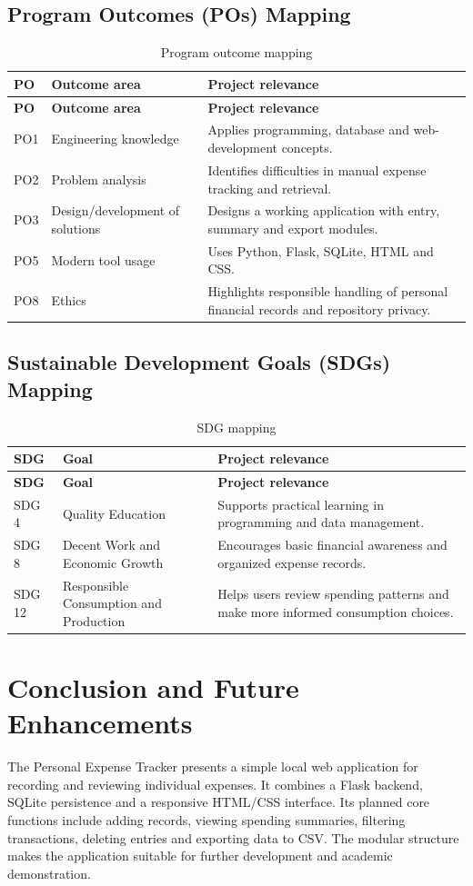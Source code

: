 \documentclass[11pt,a4paper]{report}
\begin{document}
\subsection{Program Outcomes (POs) Mapping}
\begin{longtable}{|p{1.5cm}|p{4.4cm}|p{6.7cm}|}
\caption{Program outcome mapping}\\\hline
\textbf{PO} & \textbf{Outcome area} & \textbf{Project relevance}\\\hline
\endfirsthead
\hline \textbf{PO} & \textbf{Outcome area} & \textbf{Project relevance}\\\hline
\endhead
PO1 & Engineering knowledge & Applies programming, database and web-development concepts.\\\hline
PO2 & Problem analysis & Identifies difficulties in manual expense tracking and retrieval.\\\hline
PO3 & Design/development of solutions & Designs a working application with entry, summary and export modules.\\\hline
PO5 & Modern tool usage & Uses Python, Flask, SQLite, HTML and CSS.\\\hline
PO8 & Ethics & Highlights responsible handling of personal financial records and repository privacy.\\\hline
\end{longtable}
\subsection{Sustainable Development Goals (SDGs) Mapping}
\begin{longtable}{|p{1.7cm}|p{4.7cm}|p{6.2cm}|}
\caption{SDG mapping}\\\hline
\textbf{SDG} & \textbf{Goal} & \textbf{Project relevance}\\\hline
\endfirsthead
\hline \textbf{SDG} & \textbf{Goal} & \textbf{Project relevance}\\\hline
\endhead
SDG 4 & Quality Education & Supports practical learning in programming and data management.\\\hline
SDG 8 & Decent Work and Economic Growth & Encourages basic financial awareness and organized expense records.\\\hline
SDG 12 & Responsible Consumption and Production & Helps users review spending patterns and make more informed consumption choices.\\\hline
\end{longtable}

\section{Conclusion and Future Enhancements}
The Personal Expense Tracker presents a simple local web application for recording and reviewing individual expenses. It combines a Flask backend, SQLite persistence and a responsive HTML/CSS interface. Its planned core functions include adding records, viewing spending summaries, filtering transactions, deleting entries and exporting data to CSV. The modular structure makes the application suitable for further development and academic demonstration.
\end{document}
